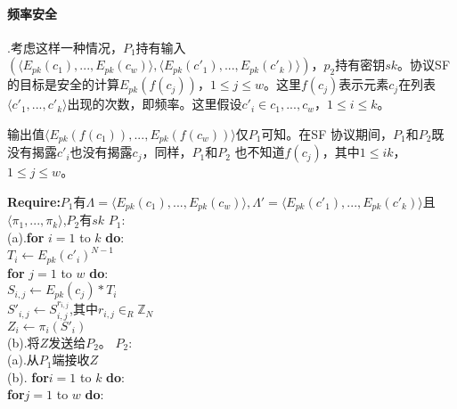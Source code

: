 \paragraph{频率安全}.考虑这样一种情况，$P_1$持有输入$(\langle E_{pk}(c_1),...,E_{pk}(c_w) \rangle,\langle E_{pk}(c'_1),...,E_{pk}(c'_k)\rangle)$，$p_2$持有密钥$sk$。协议SF的目标是安全的计算$E_{pk}(f(c_j))$，$1 \leq j \leq w$。这里$f(c_j)$表示元素$c_j$在列表$\langle c'_1,...,c'_k\rangle$出现的次数，即频率。这里假设$c'_i \in {c_1,...,c_w}$，$1 \leq i \leq k$。

输出值$\langle E_{pk}(f(c_1)),...,E_{pk}(f(c_w))\rangle$仅$P_1$可知。在SF 协议期间，$P_1$和$P_2$既没有揭露$c'_i$也没有揭露$c_j$，同样，$P_1$和$P_2$ 也不知道$f(c_j)$，其中$1 \leq i k$，$1 \leq j \leq w$。

\begin{algorithm}[ht]
\small
\caption{$SF(\Lambda,\Lambda') \rightarrow \langle E_{pk}(c_1),...,E_{pk}(f(c_w))\rangle$}
\label{alg:algorithm3}
\begin{algorithmic}[1]
   \State \textbf{Require:}$P_1$有$\Lambda=\langle E_{pk}(c_1),...,E_{pk}(c_w)\rangle,\Lambda'=\langle E_{pk}(c'_1),...,E_{pk}(c'_k)\rangle$且$\langle \pi_1 ,..., \pi_k \rangle$,$P_2$有$sk$
   \State $P_1:$\\
   (a).\hspace{0.1cm}\textbf{for} $i=1$ to $k$ \textbf{do}:\\
   \hspace{1cm}$T_i \leftarrow E_{pk}(c'_i)^{N-1}$\\
   \hspace{1cm}\textbf{for} $j=1$ to $w$ \textbf{do}:\\
   \hspace{1.5cm}$S_{i,j}\leftarrow E_{pk}(c_j)*T_i$\\
   \hspace{1.5cm}$S'_{i,j}\leftarrow S^{r_{i,j}}_{i,j}$,其中$r_{i,j}\in_R \mathbb{Z}_N$\\
   \hspace{1cm}$Z_i \leftarrow \pi_i(S'_i)$\\
   (b).将$Z$发送给$P_2$。
   \State $P_2$:\\
   (a).\hspace{0.1cm}从$P_1$端接收$Z$\\
   (b).\hspace{0.1cm} \textbf{for}$i=1$ to $k$ \textbf{do}:\\
   \hspace{0.8cm}\textbf{for}$j=1$ to $w$ \textbf{do}:\\

\end{algorithmic}
\end{algorithm}
